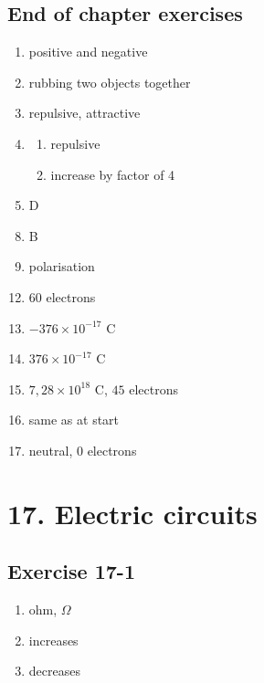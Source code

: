 \subsection{End of chapter exercises}
\begin{multicols}{3}
 \begin{enumerate}[noitemsep, label=\textbf{(\arabic*)} ]
\item positive and negative
\item rubbing two objects together
\item repulsive, attractive
\item 
 \begin{enumerate}[noitemsep, label=\textbf{(\alph*)} ]
\item repulsive
\item increase by factor of 4
 \end{enumerate}
\item D
 \end{enumerate}
\begin{enumerate}[noitemsep, label=\textbf{(\arabic*)} ]
\setcounter{enumi}{7}
 \item B
\item polarisation
\end{enumerate}
\begin{enumerate}[noitemsep, label=\textbf{(\arabic*)} ]
\setcounter{enumi}{11}
 \item $60$ electrons
\item $-376 \times 10^{−17} \text{ C}$
\item $376 \times 10^{−17} \text{ C}$
\item $7,28 \times 10^{18} \text{ C}$, $45$ electrons
\item same as at start
\item neutral, $0$ electrons
\end{enumerate}
\end{multicols}

\section{17. Electric circuits}
\subsection{Exercise 17-1}
\begin{multicols}{3}
 \begin{enumerate}[noitemsep, label=\textbf{(\arabic*)} ]
\item ohm, $\Omega$
\item increases
\item decreases
 \end{enumerate}
\end{multicols}

